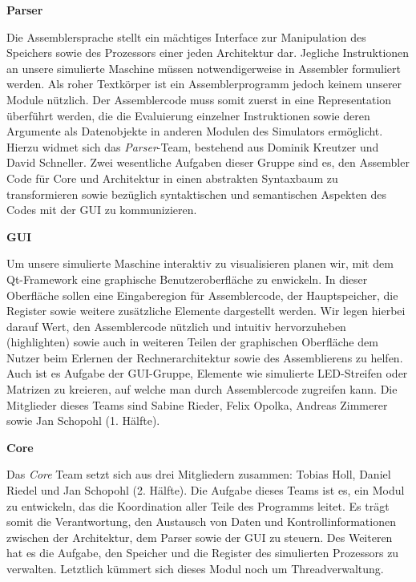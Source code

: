 \textbf{Parser}

Die Assemblersprache stellt ein mächtiges Interface zur Manipulation des
Speichers sowie des Prozessors einer jeden Architektur dar. Jegliche
Instruktionen an unsere simulierte Maschine müssen notwendigerweise in Assembler
formuliert werden. Als roher Textkörper ist ein Assemblerprogramm jedoch keinem
unserer Module nützlich. Der Assemblercode muss somit zuerst in eine
Representation überführt werden, die die Evaluierung einzelner Instruktionen
sowie deren Argumente als Datenobjekte in anderen Modulen des Simulators
ermöglicht. Hierzu widmet sich das \emph{Parser}-Team, bestehend aus Dominik
Kreutzer und David Schneller. Zwei wesentliche Aufgaben dieser Gruppe sind es,
den Assembler Code für Core und Architektur in einen abstrakten Syntaxbaum zu
transformieren sowie bezüglich syntaktischen und semantischen Aspekten des Codes
mit der GUI zu kommunizieren.

\textbf{GUI}

Um unsere simulierte Maschine interaktiv zu visualisieren planen wir, mit dem
Qt-Framework eine graphische Benutzeroberfläche zu enwickeln. In dieser
Oberfläche sollen eine Eingaberegion für Assemblercode, der Hauptspeicher, die
Register sowie weitere zusätzliche Elemente dargestellt werden. Wir legen
hierbei darauf Wert, den Assemblercode nützlich und intuitiv hervorzuheben
(highlighten) sowie auch in weiteren Teilen der graphischen Oberfläche dem
Nutzer beim Erlernen der Rechnerarchitektur sowie des Assemblierens zu
helfen. Auch ist es Aufgabe der GUI-Gruppe, Elemente wie simulierte LED-Streifen
oder Matrizen zu kreieren, auf welche man durch Assemblercode zugreifen
kann. Die Mitglieder dieses Teams sind Sabine Rieder, Felix Opolka, Andreas
Zimmerer sowie Jan Schopohl (1. Hälfte).

\textbf{Core}

Das \emph{Core} Team setzt sich aus drei Mitgliedern zusammen: Tobias Holl,
Daniel Riedel und Jan Schopohl (2. Hälfte). Die Aufgabe dieses Teams ist es, ein
Modul zu entwickeln, das die Koordination aller Teile des Programms leitet. Es
trägt somit die Verantwortung, den Austausch von Daten und Kontrollinformationen
zwischen der Architektur, dem Parser sowie der GUI zu steuern. Des Weiteren hat
es die Aufgabe, den Speicher und die Register des simulierten Prozessors zu
verwalten. Letztlich kümmert sich dieses Modul noch um Threadverwaltung.
